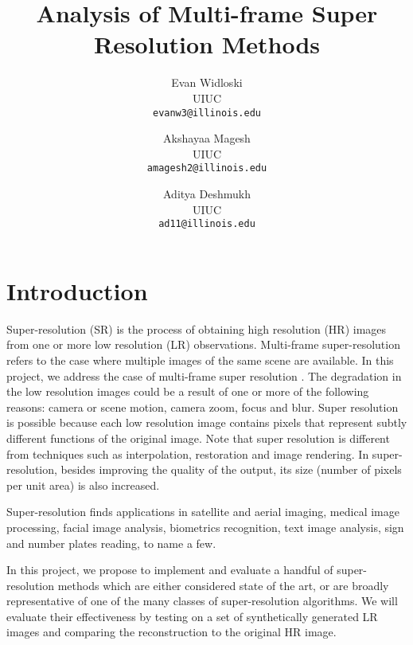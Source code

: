 \documentclass[10pt,twocolumn,letterpaper]{article}
\begin{document}
\title{Analysis of Multi-frame Super Resolution Methods}

\author{Evan Widloski\\
UIUC\\
{\tt\small evanw3@illinois.edu}
\and
Akshayaa Magesh\\
UIUC\\
{\tt\small amagesh2@illinois.edu}
\and
Aditya Deshmukh\\
UIUC\\
{\tt\small ad11@illinois.edu}
}

\maketitle

\section{Introduction}

Super-resolution (SR) is the process of obtaining high resolution (HR) images from one or more low resolution (LR) observations. Multi-frame super-resolution refers to the case where multiple images of the same scene are available. In this project, we address the case of multi-frame super resolution \cite{survey}. 
The degradation in the low resolution images could be a result of one or more of the following reasons: camera or scene motion, camera zoom, focus and blur. Super resolution is possible because each low resolution image contains pixels that represent subtly different functions of the original image. Note that super resolution is different from techniques such as interpolation, restoration and image rendering. In super-resolution, besides improving the quality of the output, its size (number of pixels per unit area) is also increased. 

Super-resolution finds applications in satellite and aerial imaging, medical image processing, facial image analysis, biometrics recognition, text image analysis, sign and number plates reading, to name a few.

In this project, we propose to implement and evaluate a handful of super-resolution methods which are either considered state of the art, or are broadly representative of one of the many classes of super-resolution algorithms.  We will evaluate their effectiveness by testing on a set of synthetically generated LR images and comparing the reconstruction to the original HR image.

\end{document}
